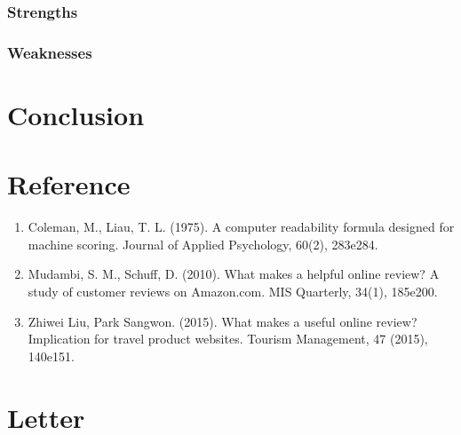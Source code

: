 \documentclass[12pt]{mcmthesis}
\begin{document}
\subsubsection{Strengths}
\subsubsection{Weaknesses}
\section{Conclusion} \label{Sec-Conclusion}
\newpage
\section{Reference}
    \begin{enumerate}[1.]
        \item Coleman, M., Liau, T. L. (1975). A computer readability formula designed for machine scoring. Journal of Applied Psychology, 60(2), 283e284.
        \item Mudambi, S. M., Schuff, D. (2010). What makes a helpful online review? A study of customer reviews on Amazon.com. MIS Quarterly, 34(1), 185e200.
        \item Zhiwei Liu, Park Sangwon. (2015). What makes a useful online review? Implication for travel product websites. Tourism Management, 47 (2015), 140e151.
    \end{enumerate}
\section*{Letter}
\end{document}
